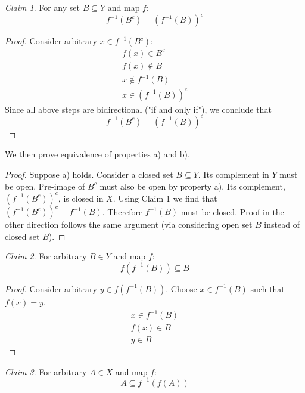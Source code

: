 \documentclass{article}
\theoremstyle{remark}
\newtheorem{claim}{Claim}
\begin{document}
\begin{claim}
For any set $B \subseteq Y$ and map $f$:
\[ f^{-1}(B^c) = (f^{-1}(B))^c \]
\end{claim}

\begin{proof}

Consider arbitrary $x \in f^{-1}(B^c)$:
\begin{gather*}
    f(x) \in B^c \\
    f(x) \notin B \\
    x \notin f^{-1}(B) \\
    x \in (f^{-1}(B))^c     
\end{gather*}
Since all above steps are bidirectional ("if and only if"), we conclude that
\[ f^{-1}(B^c) = (f^{-1}(B))^c \]

\end{proof}

We then prove equivalence of properties a) and b).

\begin{proof}

Suppose a) holds.
Consider a closed set $B \subseteq Y$.
Its complement in $Y$ must be open.
Pre-image of $B^c$ must also be open by property a).
Its complement, $(f^{-1}(B^c))^c$, is closed in $X$.
Using Claim 1 we find that $(f^{-1}(B^c))^c = f^{-1}(B)$. Therefore $f^{-1}(B)$ must be closed.
Proof in the other direction follows the same argument (via considering open set $B$ instead of closed set $B$).

\end{proof}

\begin{claim}
For arbitrary $B \in Y$ and map $f$:
\[ f(f^{-1}(B)) \subseteq B \]
\end{claim}

\begin{proof}

Consider arbitrary $y \in f(f^{-1}(B))$.
Choose $x \in f^{-1}(B)$ such that $f(x) = y$.
\begin{gather*}
    x \in f^{-1}(B) \\
    f(x) \in B \\
    y \in B    
\end{gather*}

\end{proof}

\begin{claim}
For arbitrary $A \in X$ and map $f$:
\[ A \subseteq f^{-1}(f(A)) \]
\end{claim}
\end{document}

